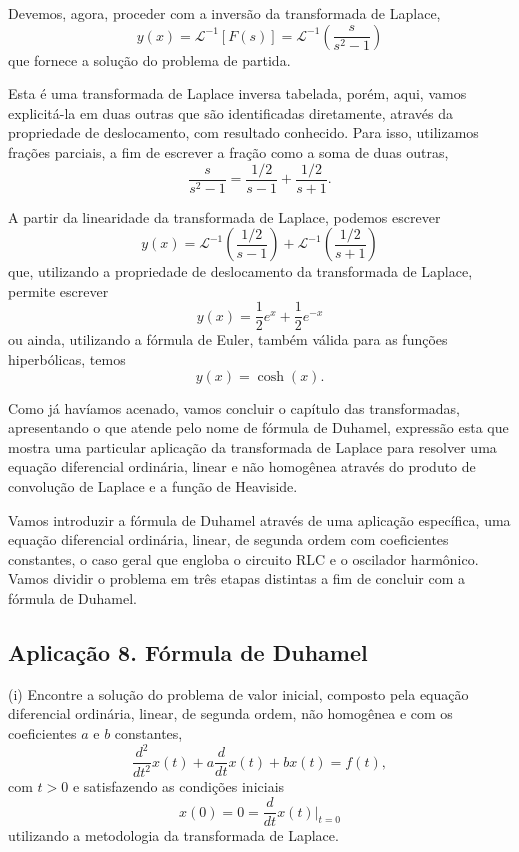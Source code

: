 Devemos, agora, proceder com a inversão da transformada de Laplace,
$$y(x) = \mathscr{L}^{-1}[F(s)] = \mathscr{L}^{-1}
\left(
\dfrac{s}{s^{2} - 1}
\right)$$
que fornece a solução do problema de partida.

Esta é uma transformada de Laplace inversa tabelada, porém, aqui, vamos explicitá-la em duas outras que são identificadas diretamente, através da propriedade de deslocamento,
com resultado conhecido. Para isso, utilizamos frações parciais, a fim de escrever a fração como a soma de duas outras,
$$
\dfrac{s}{s^{2} - 1}
=
\dfrac{1/2}{s - 1}
+
\dfrac{1/2}{s + 1}.
$$

A partir da linearidade da transformada de Laplace, podemos escrever
$$y(x) = \mathscr{L}^{-1}
\left(
\dfrac{1/2}{s - 1}
\right)
+ \mathscr{L}^{-1}
\left(
\dfrac{1/2}{s + 1}
\right)$$
que, utilizando a propriedade de deslocamento da transformada de Laplace, permite escrever
$$y(x) =
\dfrac{1}{2} e^{x} +
\dfrac{1}{2} e^{-x}$$
ou ainda, utilizando a fórmula de Euler, também válida para as funções hiperbólicas, temos
$$y(x) = \cosh(x).$$

Como já havíamos acenado, vamos concluir o capítulo das transformadas, apresentando o que atende pelo nome de fórmula de Duhamel, expressão esta que mostra uma particular aplicação da transformada de Laplace para resolver uma equação diferencial ordinária, linear e não homogênea através do produto de convolução de Laplace e a função de Heaviside.

Vamos introduzir a fórmula de Duhamel através de uma aplicação específica, uma equação diferencial ordinária, linear, de segunda ordem com coeficientes constantes, o caso geral que engloba o circuito RLC e o oscilador harmônico. Vamos dividir o problema em três etapas distintas a fim de concluir com a fórmula de Duhamel.

\subsection{Aplicação 8. Fórmula de Duhamel}

(i) Encontre a solução do problema de valor inicial, composto pela equação diferencial ordinária, linear, de segunda ordem, não homogênea e com os coeficientes $a$ e
$b$ constantes,
\begin{equation}\label{eq:aula04.21}
\dfrac{d^{2}}{dt^{2}} x(t) + a
\dfrac{d}{dt}
x(t) + b x(t) = f(t),
\end{equation}
com $t > 0$ e satisfazendo as condições iniciais
$$x(0) = 0 =
\dfrac{d}{dt}
x(t)\Bigg|_{t=0}$$
utilizando a metodologia da transformada de Laplace.


